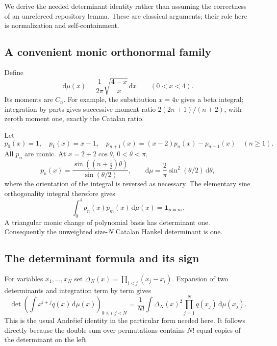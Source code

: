 \documentclass[11pt,a4paper]{article}
\numberwithin{equation}{section}
\theoremstyle{definition}
\theoremstyle{remark}
\newcommand{\dd}{\mathrm d}
\newcommand{\ind}{\mathbf 1}
\begin{document}
We derive the needed determinant identity rather than assuming the
correctness of an unrefereed repository lemma.  These are classical
arguments; their role here is normalization and self-containment.

\subsection{A convenient monic orthonormal family}
Define
\begin{equation}\label{cyc:eq:measure}
 \dd\mu(x)=\frac1{2\pi}\sqrt{\frac{4-x}{x}}\,\dd x\qquad(0<x<4).
\end{equation}
Its moments are $C_n$.  For example, the substitution $x=4v$
gives a beta integral; integration by parts gives successive moment
ratio $2(2n+1)/(n+2)$, with zeroth moment one, exactly the Catalan ratio.

Let
\begin{equation}\label{cyc:eq:prec}
 p_0(x)=1,\quad p_1(x)=x-1,\quad
 p_{n+1}(x)=(x-2)p_n(x)-p_{n-1}(x)\quad(n\ge1).
\end{equation}
All $p_n$ are monic.  At $x=2+2\cos\theta$, $0<\theta<\pi$,
\begin{equation}\label{cyc:eq:ptrig}
 p_n(x)=\frac{\sin((n+\tfrac12)\theta)}{\sin(\theta/2)},\qquad
 \dd\mu=\frac2\pi\sin^2(\theta/2)\,\dd\theta,
\end{equation}
where the orientation of the integral is reversed as necessary.
The elementary sine orthogonality integral therefore gives
\begin{equation}\label{cyc:eq:orthonormal}
 \int_0^4p_n(x)p_m(x)\,\dd\mu(x)=\ind_{n=m}.
\end{equation}
A triangular monic change of polynomial basis has determinant one.
Consequently the unweighted size-$N$ Catalan Hankel determinant is one.

\subsection{The determinant formula and its sign}
For variables $x_1,\ldots,x_N$ set
$\Delta_N(x)=\prod_{i<j}(x_j-x_i)$.
Expansion of two determinants and integration term by term gives
\begin{equation}\label{cyc:eq:andreief}
 \det\left(\int x^{i+j}q(x)\,\dd\mu(x)\right)_{0\le i,j<N}
 =\frac1{N!}\int\Delta_N(x)^2\prod_{j=1}^{N}q(x_j)\,\dd\mu(x_j).
\end{equation}
This is the usual Andr\'eief identity in the particular form needed here.
It follows directly because the double sum over permutations contains
$N!$ equal copies of the determinant on the left.
\end{document}
